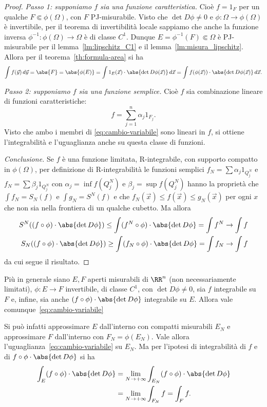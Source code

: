 \begin{proof}
\emph{Passo 1: supponiamo $f$ sia una funzione caratteristica.}
  Cioè $f = 1_{F}$ per un qualche $F\Subset \phi(\Omega)$, con $F$ PJ-misurabile.
  Visto che $\det D\phi\neq 0$ e $\phi\colon \Omega\to \phi(\Omega)$ è 
  invertibile, per il teorema di invertibilità locale sappiamo 
  che anche la funzione inversa $\phi^{-1}\colon \phi(\Omega)\to \Omega$ è di classe $C^1$.
  Dunque $E=\phi^{-1}(F)\Subset \Omega$ è PJ-misurabile per il lemma~\ref{lm:lipschitz_C1} 
  e il lemma~\ref{lm:misura_lipschitz}.
  Allora per il teorema~\ref{th:formula-area} si ha
  \[
  \int f(\vec y)\, d\vec y
  = \abs{F} = \abs{\phi(E)} = \int 1_E(\vec x) \cdot \abs{\det D\phi(\vec x)}\, d\vec x
  = \int f(\phi(\vec x)) \cdot \abs{\det D\phi(\vec x)}\, d\vec x.
  \]

\emph{Passo 2: supponiamo $f$ sia una funzione semplice.}
Cioè $f$ sia combinazione lineare di funzioni caratteristiche:
\[
   f = \sum_{j=1}^n \alpha_j 1_{F_j}.
\]
Visto che ambo i membri di \eqref{eq:cambio-variabile} sono lineari in $f$,
si ottiene l'integrabilità e l'uguaglianza anche su questa classe di funzioni.

\emph{Conclusione.} Se $f$ è una funzione limitata, R-integrabile, con supporto
compatto in $\phi(\Omega)$, per definizione di R-integrabilità 
le funzioni semplici $f_N = \sum \alpha_j 1_{Q^N_j}$ 
e $f_N = \sum \beta_j 1_{Q^N_j}$ con $\alpha_j = \inf f(Q^N_j)$ e $\beta_j = \sup f(Q^N_j)$
hanno la proprietà che $\int f_N = S_N(f)$ e $\int g_N = S^N(f)$ e che $f_N(\vec x) \le f(\vec x) \le g_N(\vec x)$ 
per ogni $x$ che non sia nella frontiera di un qualche cubetto.
Ma allora 
\begin{align*}
  S^N((f\circ \phi)\cdot \abs{\det D\phi})
  \le \int (f^N\circ\phi)\cdot \abs{\det D\phi}
  = \int f^N \to \int f\\
  S_N((f\circ \phi)\cdot \abs{\det D\phi})
  \ge \int (f_N\circ \phi)\cdot \abs{\det D\phi}
  = \int f_N \to \int f
\end{align*}
da cui segue il risultato.
\end{proof}

\begin{remark}
Più in generale siano $E,F$ aperti misurabili di $\RR^n$ (non necessariamente limitati),
$\phi\colon E\to F$ invertibile, di classe $C^1$, con $\det D\phi\neq 0$,
sia $f$ integrabile su $F$ e, infine, sia anche $(f\circ \phi)\cdot \abs{\det D\phi}$ 
integrabile su $E$.
Allora vale comunque~\eqref{eq:cambio-variabile}

Si può infatti approssimare $E$ dall'interno con compatti misurabili $E_N$ e approssimare 
$F$ dall'interno con $F_N=\phi(E_N)$. 
Vale allora l'uguaglianza~\eqref{eq:cambio-variabile} su $E_N$.
Ma per l'ipotesi di integrabilità di $f$ e di $f\circ \phi \cdot \abs{\det D\phi}$ 
si ha
\begin{align*}
  \int_{E} (f\circ \phi)\cdot \abs{\det D\phi}
  &= \lim_{N\to+\infty} \int_{E_N} (f\circ \phi)\cdot \abs{\det D\phi}\\
  &= \lim_{N\to+\infty} \int_{F_N} f
  = \int_{F} f.
\end{align*}
\end{remark}